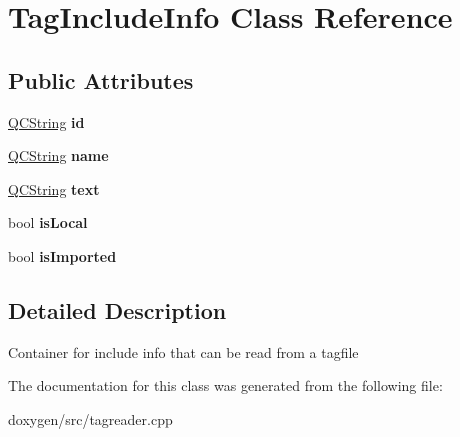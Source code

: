 \hypertarget{class_tag_include_info}{}\section{Tag\+Include\+Info Class Reference}
\label{class_tag_include_info}
\subsection*{Public Attributes}
\begin{DoxyCompactItemize}
\item 
\mbox{\label{class_tag_include_info_aae780b8503cb519554b16f9d767c4e38}} 
\mbox{\hyperlink{class_q_c_string}{Q\+C\+String}} {\bfseries id}
\item 
\mbox{\label{class_tag_include_info_a60a7cf6f8fe2465630b5fbead1bcf44d}} 
\mbox{\hyperlink{class_q_c_string}{Q\+C\+String}} {\bfseries name}
\item 
\mbox{\label{class_tag_include_info_ae282ee1c7897b57c6b6155742097c230}} 
\mbox{\hyperlink{class_q_c_string}{Q\+C\+String}} {\bfseries text}
\item 
\mbox{\label{class_tag_include_info_a4926eb44b0f0e2324b58501d4facb4b5}} 
bool {\bfseries is\+Local}
\item 
\mbox{\label{class_tag_include_info_a9798905f48ab4a543317647199c206d0}} 
bool {\bfseries is\+Imported}
\end{DoxyCompactItemize}


\subsection{Detailed Description}
Container for include info that can be read from a tagfile 

The documentation for this class was generated from the following file\+:\begin{DoxyCompactItemize}
\item 
doxygen/src/tagreader.\+cpp\end{DoxyCompactItemize}

